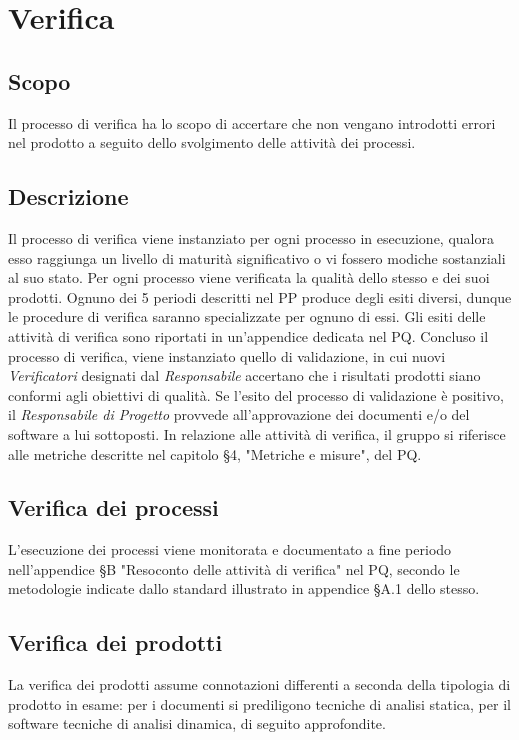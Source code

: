 \documentclass[../NormediProgetto.tex]{subfiles}
\begin{document}
	
	
	
\section{Verifica}

\subsection{Scopo}
Il processo di verifica ha lo scopo di accertare che non vengano introdotti errori nel prodotto a seguito dello svolgimento delle attività dei processi.

\subsection{Descrizione}

Il processo di verifica viene instanziato per ogni processo in esecuzione, qualora esso raggiunga un livello di maturità significativo o vi fossero modiche sostanziali al suo stato. Per ogni processo viene verificata la qualità dello stesso e dei suoi prodotti. Ognuno dei 5 periodi descritti nel PP produce degli esiti diversi, dunque le procedure di verifica saranno specializzate per ognuno di essi. Gli esiti delle attività di
verifica sono riportati in un'appendice dedicata nel PQ. Concluso il processo di verifica, viene instanziato quello di validazione, in cui nuovi \textit{Verificatori} designati dal \textit{Responsabile} accertano che i risultati prodotti siano conformi agli obiettivi di qualità. Se l'esito del processo di validazione è positivo, il \textit{Responsabile di Progetto} provvede all'approvazione dei documenti e/o del software a lui sottoposti.
In relazione alle attività di verifica, il gruppo si riferisce alle metriche descritte nel capitolo §4, "Metriche e misure", del PQ.

\subsection{Verifica dei processi} 
L'esecuzione dei processi viene monitorata e documentato a fine periodo nell'appendice §B "Resoconto delle attività di verifica" nel PQ, secondo le metodologie indicate dallo standard  illustrato in appendice §A.1 dello stesso.

\subsection{Verifica dei prodotti}
La verifica dei prodotti assume connotazioni differenti a seconda della tipologia di prodotto in esame: per i documenti si prediligono tecniche di analisi statica, per il software tecniche di analisi dinamica, di seguito approfondite.
\end{document}

